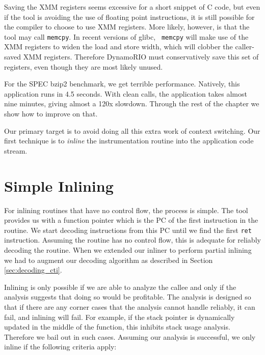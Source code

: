 Saving the XMM registers seems excessive for a short snippet of C code, but even
if the tool is avoiding the use of floating point instructions, it is still
possible for the compiler to choose to use XMM registers.  More likely, however,
is that the tool may call {\tt memcpy}.  In recent versions of glibc, {\tt
memcpy} will make use of the XMM registers to widen the load and store width,
which will clobber the caller-saved XMM registers.  Therefore DynamoRIO must
conservatively save this set of registers, even though they are most likely
unused.

For the SPEC bzip2 benchmark, we get terrible performance.  Natively, this
application runs in 4.5 seconds.  With clean calls, the application takes
almost nine minutes, giving almost a 120x slowdown.  Through the rest of the
chapter we show how to improve on that.

Our primary target is to avoid doing all this extra work of context switching.
Our first technique is to {\em inline} the instrumentation routine into the
application code stream.

\section{Simple Inlining}
\label{sec:simple_inlining}

For inlining routines that have no control flow, the process is simple.  The
tool provides us with a function pointer which is the PC of the first
instruction in the routine.  We start decoding instructions from this PC until
we find the first {\tt ret} instruction.  Assuming the routine has no control
flow, this is adequate for reliably decoding the routine.  When we extended our
inliner to perform partial inlining we had to augment our decoding algorithm as
described in Section \ref{sec:decoding_cti}.

Inlining is only possible if we are able to analyze the callee and only if the
analysis suggests that doing so would be profitable.  The analysis is designed
so that if there are any corner cases that the analysis cannot handle reliably,
it can fail, and inlining will fail.  For example, if the stack pointer is
dynamically updated in the middle of the function, this inhibits stack usage
analysis.  Therefore we bail out in such cases.  Assuming our analysis is
successful, we only inline if the following criteria apply:

